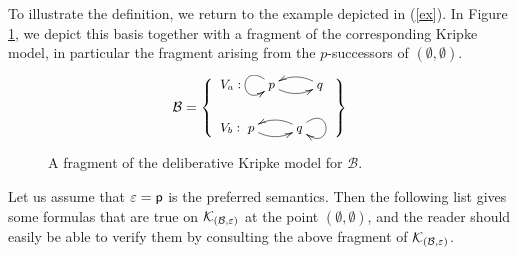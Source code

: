 \documentclass{llncs}
\newcommand{\kmod}[2]{{\cal K}_{(#1,#2)}}
\newcommand{\views}{\mathcal B}
\newcommand{\sem}{\varepsilon}
\begin{document}

To illustrate the definition, we return to the example depicted in (\ref{ex}). In Figure \ref{tbl:dynamism-3}, we depict this basis together with a fragment of the corresponding Kripke model, in particular the fragment arising from the $p$-successors of $(\emptyset,\emptyset)$.

%
%    

\begin{figure}[ht]
\begin{minipage}[t]{10em}
$$ \small
\views = \left\{\begin{array}{l} V_a: \hspace{1.5em} \xymatrix{p \ar@(lu,ld) \ar@/_/[r] & q \ar@/_/[l] } \vspace{2em}  \\ V_b: \xymatrix{p \ar@/_/[r] & q \ar@(ru,rd) \ar@/_/[l] }
\end{array}\right\}$$
\end{minipage}
\begin{minipage}[t]{28em} \hspace{0.2em}
  \centering
  \def\svgwidth{\textwidth}
  \begin{tiny}
%    
  \end{tiny}
\end{minipage}
  \caption{A fragment of the deliberative Kripke model for $\views$.}
  \label{tbl:dynamism-3}
\end{figure}

Let us assume that $\sem = \sf p$ is the preferred semantics. Then the following list gives some formulas that are true on $\kmod \views \sem$ at the point $(\emptyset,\emptyset)$, and the reader should easily be able to verify them by consulting the above fragment of $\kmod \views \sem$.
\end{document}
